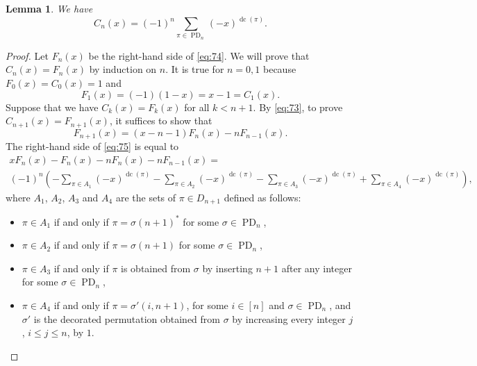 \documentclass[oneside]{book}
\numberwithin{equation}{section}
\newtheorem{lem}[thm]{Lemma}
\theoremstyle{definition}
\newcommand\PD{\operatorname{PD}}
\newcommand\dc{\operatorname{dc}}
\newcommand\sgn{\operatorname{sgn}}
\begin{document}
\begin{lem}\label{lem:9}
  We have
 \begin{equation}\label{eq:74}
    C_n(x) = (-1)^{n} \sum_{\pi \in \PD_n}  (-x)^{\dc(\pi)}.
  \end{equation}
\end{lem}

\begin{proof}
  Let \( F_n(x) \) be the right-hand side of \eqref{eq:74}.
  We will prove that \( C_n(x) = F_n(x) \) by induction on \( n \).
  It is true for \( n=0,1 \) because
  \( F_0(x) = C_0(x) = 1 \) and
  \[
    F_1(x) = (-1) (1-x) = x-1 = C_1(x).
  \]
  Suppose that we have \( C_k(x) = F_k(x) \) for all \( k<n+1 \). By
  \eqref{eq:73}, to prove \( C_{n+1}(x) = F_{n+1}(x) \), it suffices
  to show that
  \begin{equation}\label{eq:75}
  F_{n+1}(x) = (x-n-1) F_n(x) - n F_{n-1}(x).
  \end{equation}
  The right-hand side of \eqref{eq:75} is equal to
 \begin{multline*}
   xF_n(x)-F_n(x)-nF_n(x) - n F_{n-1}(x) = \\
   (-1)^{n} \left(
  - \sum_{\pi \in A_1} (-x)^{\dc(\pi)} 
 -\sum_{\pi \in A_2} (-x)^{\dc(\pi)} 
 -\sum_{\pi \in A_3} (-x)^{\dc(\pi)} 
 +\sum_{\pi \in A_4} (-x)^{\dc(\pi)} \right),
 \end{multline*} 
 where \( A_1 \), \( A_2 \), \( A_3 \) and \( A_4 \) are the sets of
 \( \pi\in D_{n+1} \) defined as follows:
 \begin{itemize}
 \item \( \pi\in A_1 \) if and only if \( \pi = \sigma (n+1)^* \) for some
   \( \sigma\in \PD_n \),
 \item \( \pi\in A_2 \) if and only if \( \pi = \sigma (n+1) \) for some
   \( \sigma\in \PD_n \),
 \item \( \pi\in A_3 \) if and only if \( \pi \) is obtained from
   \( \sigma \) by inserting \( n+1 \) after any integer for some
   \( \sigma\in \PD_n \),
 \item \( \pi\in A_4 \) if and only if \( \pi = \sigma'(i,n+1) \), for
   some \( i\in [n] \) and \( \sigma\in \PD_n \), and \( \sigma' \) is
   the decorated permutation obtained from \( \sigma \) by increasing
   every integer \( j \), \( i\le j\le n \), by \( 1 \).
 \end{itemize}
  

\end{proof}
\end{document}

